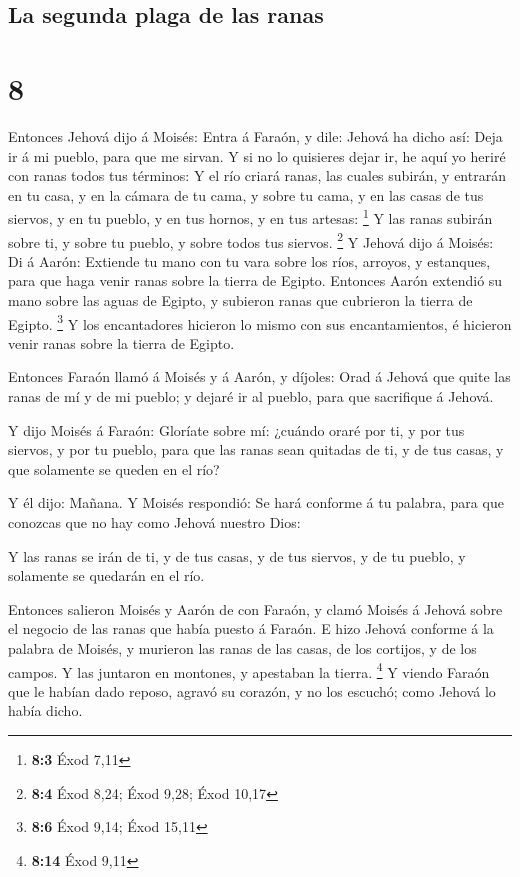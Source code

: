 \hypertarget{la-segunda-plaga-de-las-ranas}{%
\subsection{La segunda plaga de las
ranas}\label{la-segunda-plaga-de-las-ranas}}

\hypertarget{section-7}{%
\section{8}\label{section-7}}

 Entonces Jehová dijo á Moisés: Entra á Faraón, y dile:
Jehová ha dicho así: Deja ir á mi pueblo, para que me sirvan.
 Y si no lo quisieres dejar ir, he aquí yo heriré con ranas
todos tus términos:  Y el río criará ranas, las cuales
subirán, y entrarán en tu casa, y en la cámara de tu cama, y sobre tu
cama, y en las casas de tus siervos, y en tu pueblo, y en tus hornos, y
en tus artesas: \footnote{\textbf{8:3} Éxod 7,11}  Y las
ranas subirán sobre ti, y sobre tu pueblo, y sobre todos tus siervos.
\footnote{\textbf{8:4} Éxod 8,24; Éxod 9,28; Éxod 10,17}  Y
Jehová dijo á Moisés: Di á Aarón: Extiende tu mano con tu vara sobre los
ríos, arroyos, y estanques, para que haga venir ranas sobre la tierra de
Egipto.  Entonces Aarón extendió su mano sobre las aguas de
Egipto, y subieron ranas que cubrieron la tierra de Egipto. \footnote{\textbf{8:6}
  Éxod 9,14; Éxod 15,11}  Y los encantadores hicieron lo
mismo con sus encantamientos, é hicieron venir ranas sobre la tierra de
Egipto.

 Entonces Faraón llamó á Moisés y á Aarón, y díjoles: Orad á
Jehová que quite las ranas de mí y de mi pueblo; y dejaré ir al pueblo,
para que sacrifique á Jehová.

 Y dijo Moisés á Faraón: Gloríate sobre mí: ¿cuándo oraré
por ti, y por tus siervos, y por tu pueblo, para que las ranas sean
quitadas de ti, y de tus casas, y que solamente se queden en el río?

 Y él dijo: Mañana. Y Moisés respondió: Se hará conforme á
tu palabra, para que conozcas que no hay como Jehová nuestro Dios:

 Y las ranas se irán de ti, y de tus casas, y de tus
siervos, y de tu pueblo, y solamente se quedarán en el río.

 Entonces salieron Moisés y Aarón de con Faraón, y clamó
Moisés á Jehová sobre el negocio de las ranas que había puesto á Faraón.
 E hizo Jehová conforme á la palabra de Moisés, y murieron
las ranas de las casas, de los cortijos, y de los campos. 
Y las juntaron en montones, y apestaban la tierra. \footnote{\textbf{8:14}
  Éxod 9,11}  Y viendo Faraón que le habían dado reposo,
agravó su corazón, y no los escuchó; como Jehová lo había dicho.


